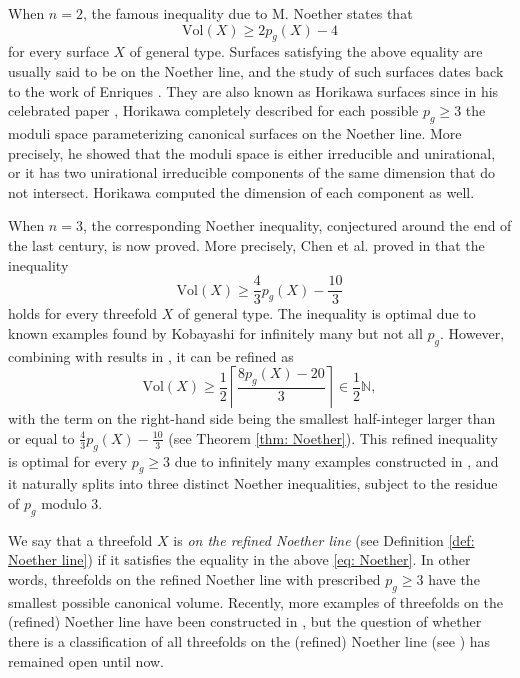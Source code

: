 \documentclass[a4paper,11pt]{amsart}
\theoremstyle{definition}
\theoremstyle{remark}
\numberwithin{equation}{section}
\begin{document}
When $n = 2$, the famous inequality due to M. Noether \cite{Noether} states that
$$
\mathrm{Vol}(X) \ge 2p_g(X) - 4
$$
for every surface $X$ of general type. Surfaces satisfying the above equality are usually said to be on the Noether line, and the study of such surfaces dates back to the work of Enriques \cite{Enriques}. They are also known as Horikawa surfaces since in his celebrated paper \cite{Horikawa1}, Horikawa completely described for each possible $p_g \ge 3$ the moduli space parameterizing canonical surfaces on the Noether line. More precisely, he showed that the moduli space is either irreducible and unirational, or it has two unirational irreducible components of the same dimension that do not intersect. Horikawa computed the dimension of each component as well.

When $n = 3$, the corresponding Noether inequality, conjectured around the end of the last century, is now proved. More precisely, Chen et al. proved in \cite{CCJ,CCJAdd,CHJ} that the inequality 
\begin{equation} \label{eq: Noether1}
    \mathrm{Vol}(X) \ge \frac{4}{3} p_g(X) - \frac{10}{3}
\end{equation}
holds for every threefold $X$ of general type. The inequality is optimal due to known examples found by Kobayashi \cite{Kobayashi} for infinitely many but not all $p_g$. However, combining with results in \cite{HZ}, it can be refined as
\begin{equation} \label{eq: Noether}
    \mathrm{Vol}(X) \ge \frac{1}{2} \left \lceil {\frac{8p_g(X) - 20}{3}} \right \rceil \in \frac12 {\mathbb N},
\end{equation}
with the term on the right-hand side being the smallest half-integer larger than or equal to $\frac43 p_g(X) - \frac{10}3$ (see Theorem \ref{thm: Noether}). This refined inequality is optimal for every $p_g \ge 3$ due to infinitely many examples constructed in \cite{CP,HZ}, and it naturally splits into three distinct Noether inequalities, subject to the residue of $p_g$ modulo $3$.

We say that a threefold $X$ is \emph{on the refined Noether line} (see Definition \ref{def: Noether line}) if it satisfies the equality in the above \eqref{eq: Noether}. In other words, threefolds on the refined Noether line with prescribed $p_g \ge 3$ have the smallest possible canonical volume. Recently, more examples of threefolds on the (refined) Noether line have been constructed in \cite{CH,CP,CJL}, but the question of whether there is a classification of all threefolds on the (refined) Noether line (see \cite[Question 1.5]{CCJ}) has remained open until now.
\end{document}
